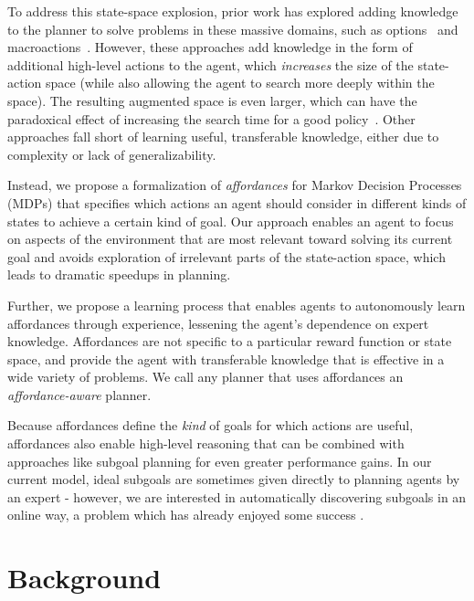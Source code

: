 \documentclass[conference]{IEEEtran}
\begin{document}
To address this state-space explosion, prior work has explored adding
knowledge to the planner to solve problems in these
massive domains, such as options~\cite{sutton99} and
macroactions~\cite{Botea:2005kx,Newton:2005vn}. However, these
approaches add knowledge in the form of additional high-level actions
to the agent, which {\em increases} the size of the state-action space
(while also allowing the agent to search more deeply within the
space).  The resulting augmented space is even larger, which can have
the paradoxical effect of increasing the search time for a good
policy~\cite{Jong:2008zr}. Other approaches fall short of learning useful, transferable knowledge,
either due to complexity or lack of generalizability.

Instead, we propose a formalization of {\em affordances} \cite{gibson77} for Markov Decision Processes (MDPs) that
specifies which actions an agent should consider in different kinds of states to achieve a certain kind of goal.
Our approach enables an agent to focus on
aspects of the environment that are most relevant toward solving its current goal 
and avoids exploration of irrelevant parts of the 
state-action space, which leads to dramatic speedups in planning.

Further, we propose a learning process that enables agents to
autonomously learn affordances through experience, lessening the
agent's dependence on expert knowledge. Affordances are not specific
to a particular reward function or state space, and provide the agent
with transferable knowledge that is effective in a wide variety of
problems. We call any planner that uses affordances an {\it
  affordance-aware} planner.

Because affordances define the {\em kind} of goals for which actions
are useful, affordances also enable high-level reasoning that can be
combined with approaches like subgoal planning for even
greater performance gains. In our current model, ideal subgoals are
sometimes given directly to planning agents by an expert - however, we are
interested in automatically discovering subgoals in an online way, a
problem which has already enjoyed some success
\cite{Mcgovern01automaticdiscovery,Simsek:2005:IUS:1102351.1102454}.


\section{Background}
\label{sec:background}
\end{document}
